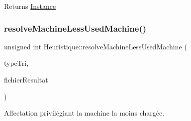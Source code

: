 \begin{DoxyReturn}{Returns}
\hyperlink{classInstance}{Instance} 
\end{DoxyReturn}
\mbox{\label{classHeuristique_aee20a4baec95a33533a6e13029c437df}} 
\subsubsection{\texorpdfstring{resolve\+Machine\+Less\+Used\+Machine()}{resolveMachineLessUsedMachine()}}
{\footnotesize\ttfamily unsigned int Heuristique\+::resolve\+Machine\+Less\+Used\+Machine (\begin{DoxyParamCaption}\item[{Q\+String}]{type\+Tri,  }\item[{Q\+String}]{fichier\+Resultat }\end{DoxyParamCaption})}



Affectation privilégiant la machine la moins chargée. 


